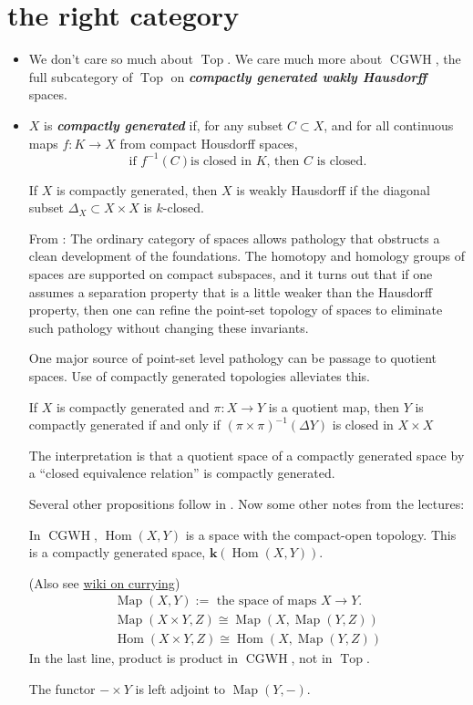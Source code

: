 \documentclass{article}
\DeclareMathOperator{\Top}{Top}
\DeclareMathOperator{\CGWH}{CGWH}
\DeclareMathOperator{\Hom}{Hom}
\DeclareMathOperator{\Map}{Map}
\begin{document}
\section{the right category}
\begin{itemize}
	\item We don't care so much about $\Top$. We care much more about $\CGWH$, the full subcategory of $\Top$ on \textbf{\textit{compactly generated wakly Hausdorff}} spaces.
	\item $X$ is \textbf{\textit{compactly generated}} if, for any subset $C\subset X$, and for all continuous maps $f:K\to X$ from compact Housdorff spaces, \[\text{if } f^{-1}(C) \text{is closed in }K\text{, then } C\text{ is closed}.\]
	\begin{claim}
		If $X$ is compactly generated, then $X$ is weakly Hausdorff if the diagonal subset $\Delta_X\subset X\times X$ is {\color{orange}$k$-closed}.
	\end{claim}
	From \cite{may}: The ordinary category of spaces allows pathology that obstructs a clean development of the foundations. The homotopy and homology groups of spaces are supported on compact subspaces, and it turns out that if one assumes a separation property that is a little weaker than the Hausdorff property, then one can refine the point-set topology of spaces to eliminate such pathology without changing these invariants.
	
	One major source of point-set level pathology can be passage to quotient spaces. Use of compactly generated topologies alleviates this.
	\begin{prop}
		If $X$ is compactly generated and $\pi:X\to Y$ is a quotient map, then $Y$ is compactly generated if and only if $(\pi\times \pi)^{-1}(\Delta Y)$ is closed in $X\times X$
	\end{prop}
	The interpretation is that a quotient space of a compactly generated space by a “closed equivalence relation” is compactly generated.
	
	{\color{cyan}Several other propositions follow in \cite{may}. Now some other notes from the lectures:}
	
	In $\CGWH$, $\Hom(X,Y)$ is a space with the compact-open topology. {\color{orange} This is a compactly generated space, $\mathbf{k}(\Hom(X,Y))$}. 
\begin{remark}
	(Also see \href{https://en.wikipedia.org/wiki/Currying#Function_spaces}{wiki on currying})
	\begin{align*}
		\Map(X,Y):=\text{ the space of maps }X\to Y.\\
		\Map(X\times Y,Z)\cong\Map(X,\Map(Y,Z))\\
		\Hom(X\times Y,Z)\cong \Hom(X,\Map(Y,Z))
	\end{align*}
	In the last line, product is product in $\CGWH$, not in $\Top$.

The functor $-\times Y$ is left adjoint to $\Map(Y,-)$.
\end{remark}
\end{itemize}
\end{document}
